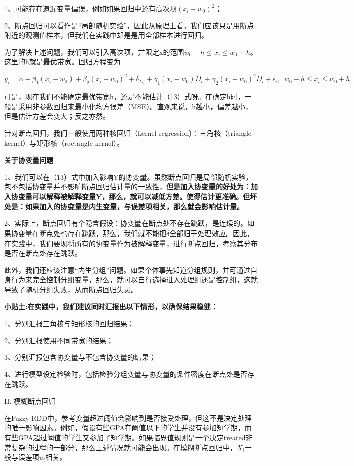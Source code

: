 \documentclass[cn,12pt,math=newtx,citestyle=gb7714-2015,bibstyle=gb7714-2015]{elegantbook}
\begin{document}
	1、可能存在遗漏变量偏误，例如如果回归中还有高次项$(x_i-w_0)^2$；
	
	2、断点回归可以看作是“局部随机实验”，因此从原理上看，我们应该只是用断点附近的观测值样本，但我们在实践中却是是用全部样本进行回归。
	
	为了解决上述问题，我们可以引入高次项，并限定x的范围$w_0-h\le{x_i}\le{w_0+h}$。这里的h就是最优带宽。回归方程变为
	
	\begin{equation}
		y_i=\alpha+\beta_1(x_i-w_0)+\beta_2(x_i-w_0)^2+\delta_{D_i}+\gamma_1(x_i-w_0)D_i+\gamma_2(x_i-w_0)^2D_i+\epsilon_i,~~w_0-h\le{x_i}\le{w_0+h}
	\end{equation}
	
	可是，现在我们不能确定最优带宽h，还是不能估计（13）式呀。在确定h时，一般是采用非参数回归来最小化均方误差（MSE）。直观来说，h越小，偏差越小，但是估计方差会变大；反之亦然。
	
	针对断点回归，我们一般使用两种核回归（kernel regression）：三角核（triangle kernel）与矩形核（rectangle kernel）。
	
	\textbf{关于协变量问题}
	
	1、我们可以在（13）式中加入影响Y的协变量。虽然断点回归是局部随机实验，包不包括协变量并不影响断点回归估计量的一致性，\textbf{但是加入协变量的好处为：加入协变量可以解释被解释变量Y，那么，就可以减低方差。使得估计更准确。但坏处是：如果加入的协变量是内生变量，与误差项相关，那么就会影响估计量。}
	
	2、实际上，断点回归有个隐含假设：协变量在断点处不存在跳跃，是连续的。如果协变量在断点处也存在跳跃，那么，我们就不能把$\tilde{\delta}$全部归于处理效应。因此，在实践中，我们要现将所有的协变量作为被解释变量，进行断点回归，考察其分布是否在断点处存在跳跃。
	
	此外，我们还应该注意“内生分组”问题。如果个体事先知道分组规则，并可通过自身行为来完全控制分组变量，那么，就可以自行选择进入处理组还是控制组，这就导致了随机分组失败，从而断点回归失灵。
	
	\textbf{小贴士:在实践中，我们建议同时汇报出以下情形，以确保结果稳健：}
	
	1、分别汇报三角核与矩形核的回归结果；
	
	2、分别汇报使用不同带宽的结果；
	
	3、分别汇报包含协变量与不包含协变量的结果；
	
	4、进行模型设定检验时，包括检验分组变量与协变量的条件密度在断点处是否存在跳跃。
	
	
	II. 模糊断点回归
	
	在Fuzzy RDD中，参考变量超过阈值会影响到是否接受处理，但这不是决定处理的唯一影响因素。例如，假设有些GPA在阈值以下的学生并没有参加短学期，而有些GPA超过阈值的学生又参加了短学期。如果临界值规则是一个决定treated非常复杂的过程的一部分，那么上述情况就可能会出现。在模糊断点回归中，$X_i$一般与误差项$u_i$相关。
	
\end{document}

